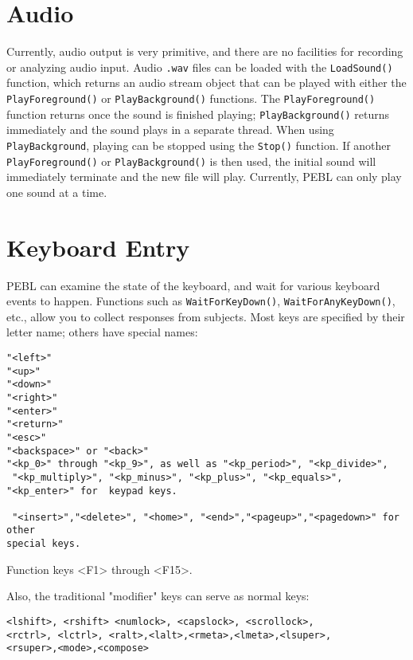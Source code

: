 \section{Audio}

Currently, audio output is very primitive, and there are no facilities for recording or analyzing audio input. Audio \texttt{.wav} files can be loaded with the \texttt{LoadSound()} function, which returns an audio stream object that can be played  with either the \texttt{PlayForeground()} or \texttt{PlayBackground()} functions.  
The \texttt{PlayForeground()} function returns once the sound is finished playing; \texttt{PlayBackground()} returns immediately and the sound plays in a separate thread.  When using \texttt{PlayBackground}, playing can be stopped using the \texttt{Stop()} function.  If another \texttt{PlayForeground()} or \texttt{PlayBackground()} is then used,
the initial sound will immediately terminate and the new file will play. Currently, PEBL can only play one sound at a time.


\section{Keyboard Entry}

PEBL can examine the state of the keyboard, and wait for various
keyboard events to happen. Functions such as
\texttt{WaitForKeyDown()}, \texttt{WaitForAnyKeyDown()}, etc., allow
you to collect responses from subjects. Most keys are specified by
their letter name; others have special names:
\begin{verbatim}
"<left>"
"<up>"
"<down>"
"<right>"
"<enter>"
"<return>"
"<esc>"
"<backspace>" or "<back>"
"<kp_0>" through "<kp_9>", as well as "<kp_period>", "<kp_divide>",
 "<kp_multiply>", "<kp_minus>", "<kp_plus>", "<kp_equals>",
"<kp_enter>" for  keypad keys.

 "<insert>","<delete>", "<home>", "<end>","<pageup>","<pagedown>" for other
special keys.
\end{verbatim}

Function keys <F1> through <F15>.

Also, the traditional "modifier" keys can serve as normal keys:


\begin{verbatim}
<lshift>, <rshift> <numlock>, <capslock>, <scrollock>, 
<rctrl>, <lctrl>, <ralt>,<lalt>,<rmeta>,<lmeta>,<lsuper>,
<rsuper>,<mode>,<compose>

\end{verbatim}


